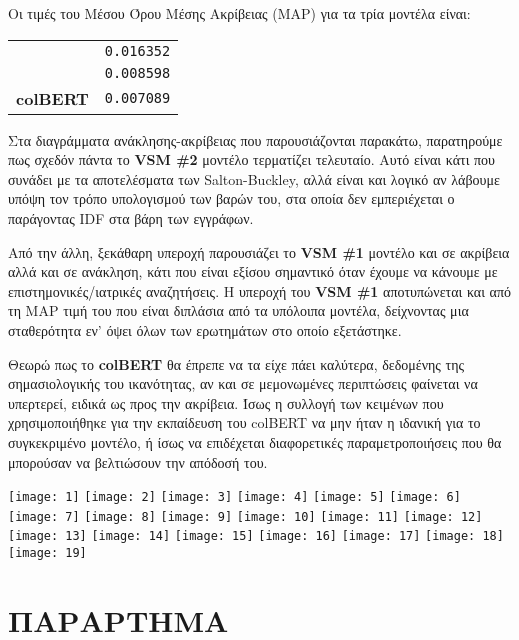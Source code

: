 ﻿\documentclass[12pt]{report}
\begin{document}
    Οι τιμές του Μέσου Όρου Μέσης Ακρίβειας (MAP) για τα τρία μοντέλα είναι:
    \begin{graycomment}
        \centering
        \begin{tabular}{ l l }
            \textbf{VSM #1}  & \texttt{0.016352} \\
            \textbf{VSM #2}  & \texttt{0.008598} \\
            \textbf{colBERT} & \texttt{0.007089}
        \end{tabular}
    \end{graycomment}

    Στα διαγράμματα ανάκλησης-ακρίβειας που παρουσιάζονται παρακάτω, παρατηρούμε πως σχεδόν πάντα το \textbf{VSM \#2} μοντέλο τερματίζει τελευταίο.
    Αυτό είναι κάτι που συνάδει με τα αποτελέσματα των Salton-Buckley, αλλά είναι και λογικό αν λάβουμε υπόψη τον τρόπο υπολογισμού των βαρών του, στα οποία δεν εμπεριέχεται ο παράγοντας IDF στα βάρη των εγγράφων.

    Από την άλλη, ξεκάθαρη υπεροχή παρουσιάζει το \textbf{VSM \#1} μοντέλο και σε ακρίβεια αλλά και σε ανάκληση, κάτι που είναι εξίσου σημαντικό όταν έχουμε να κάνουμε με επιστημονικές/ιατρικές αναζητήσεις.
    Η υπεροχή του \textbf{VSM \#1} αποτυπώνεται και από τη MAP τιμή του που είναι διπλάσια από τα υπόλοιπα μοντέλα, δείχνοντας μια σταθερότητα εν' όψει όλων των ερωτημάτων στο οποίο εξετάστηκε.

    Θεωρώ πως το \textbf{colBERT} θα έπρεπε να τα είχε πάει καλύτερα, δεδομένης της σημασιολογικής του ικανότητας, αν και σε μεμονωμένες περιπτώσεις φαίνεται να υπερτερεί, ειδικά ως προς την ακρίβεια.
    Ίσως η συλλογή των κειμένων που χρησιμοποιήθηκε για την εκπαίδευση του colBERT να μην ήταν η ιδανική για το συγκεκριμένο μοντέλο, ή ίσως να επιδέχεται διαφορετικές παραμετροποιήσεις που θα μπορούσαν να βελτιώσουν την απόδοσή του.


    \begin{multicols}{2}
        \centering
        \noindent\texttt{[image: 1]}
        \texttt{[image: 2]}
        \texttt{[image: 3]}
        \texttt{[image: 4]}
        \texttt{[image: 5]}
        \texttt{[image: 6]}
        \texttt{[image: 7]}
        \texttt{[image: 8]}
        \texttt{[image: 9]}
        \texttt{[image: 10]}
        \texttt{[image: 11]}
        \texttt{[image: 12]}
        \texttt{[image: 13]}
        \texttt{[image: 14]}
        \texttt{[image: 15]}
        \texttt{[image: 16]}
        \texttt{[image: 17]}
        \texttt{[image: 18]}
        \texttt{[image: 19]}
    \end{multicols}


    \chapter{ΠΑΡΑΡΤΗΜΑ}
    
\end{document}

